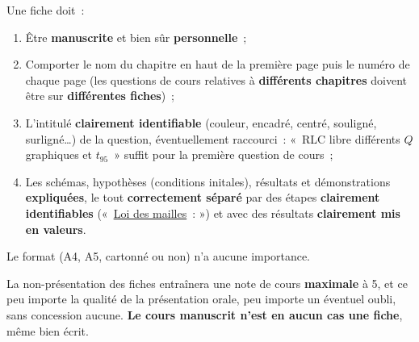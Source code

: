 \documentclass[a4paper, 12pt, final, garamond]{book}
\begin{document}
Une fiche doit~:
\begin{enumerate}
    \item Être \textbf{manuscrite} et bien sûr \textbf{personnelle}~;

    \item Comporter le nom du chapitre en haut de la première page puis le
        numéro de chaque page (les questions de cours relatives à
        \textbf{différents chapitres} doivent être sur \textbf{différentes
        fiches})~;

    \item L'intitulé \textbf{clairement identifiable} (couleur, encadré,
        centré, souligné, surligné…) de la question, éventuellement raccourci~:
        «~RLC libre différents $Q$ graphiques et $t_{95}$~» suffit pour la
        première question de cours~;

    \item Les schémas, hypothèses (conditions initales), résultats et
        démonstrations \textbf{expliquées}, le tout \textbf{correctement séparé}
        par des étapes \textbf{clairement identifiables} («~\underline{Loi des
        mailles}~: ») et avec des résultats \textbf{clairement mis en valeurs}.
\end{enumerate}

Le format (A4, A5, cartonné ou non) n'a aucune importance.

\begin{framed}
    \begin{center}
        \Huge La non-présentation des fiches entraînera une note de cours
        \textbf{maximale} à 5, et ce peu importe la qualité de la présentation
        orale, peu importe un éventuel oubli, sans concession aucune. \textbf{Le
        cours manuscrit n'est en aucun cas une fiche}, même bien écrit.
    \end{center}
\end{framed}
\end{document}
